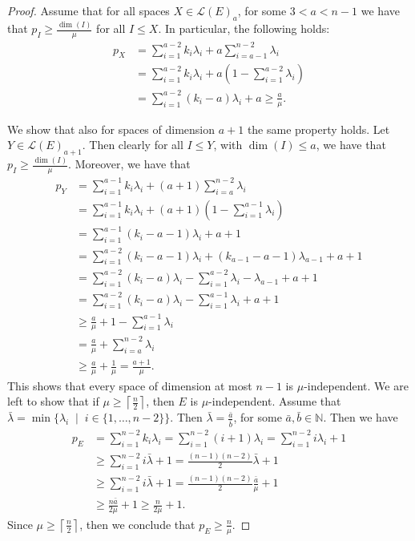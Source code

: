 \documentclass[a4paper,11pt,reqno]{amsart}
\theoremstyle{definition}
\newcommand{\mL}{\mathcal{L}}
\begin{document}
{\begin{proof}
Assume that for all spaces $X\in\mL(E)_a$, for some $3<a<n-1$ we have that $p_I\geq \frac{\dim(I)}{\mu}$ for all $I\leq X$. 
In particular, the following holds:
\begin{align*}
    p_X &= \sum\limits_{i=1}^{a-2}k_i\lambda_i + a\sum\limits_{i=a-1}^{n-2}\lambda_i \\
    &= \sum\limits_{i=1}^{a-2}k_i\lambda_i + a\left(1-\sum\limits_{i=1}^{a-2}\lambda_i \right) \\
    &=\sum\limits_{i=1}^{a-2}(k_i-a)\lambda_i + a \geq \frac{a}{\mu}.
\end{align*}

We show that also for spaces of dimension $a+1$ the same property holds. Let $Y\in\mL(E)_{a+1}$. Then clearly for all $I\leq Y$, with $\dim(I)\leq a$, we have that $p_I\geq \frac{\dim(I)}{\mu}$. Moreover, we have that
\begin{align*}
    p_Y &= \sum\limits_{i=1}^{a-1}k_i\lambda_i + (a+1)\sum\limits_{i=a}^{n-2}\lambda_i \\
    &= \sum\limits_{i=1}^{a-1}k_i\lambda_i + (a+1)\left(1-\sum\limits_{i=1}^{a-1}\lambda_i \right) \\
    &=\sum\limits_{i=1}^{a-1}(k_i-a-1)\lambda_i + a+1\\
     &=\sum\limits_{i=1}^{a-2}(k_i-a-1)\lambda_i + (k_{a-1}-a-1)\lambda_{a-1}+ a+1\\
     &=\sum\limits_{i=1}^{a-2}(k_i-a)\lambda_i -\sum\limits_{i=1}^{a-2}\lambda_i -\lambda_{a-1}+ a+1\\
      &=\sum\limits_{i=1}^{a-2}(k_i-a)\lambda_i -\sum\limits_{i=1}^{a-1}\lambda_i + a+1\\
      &\geq \frac{a}{\mu} +1-\sum\limits_{i=1}^{a-1}\lambda_i\\
      &= \frac{a}{\mu} + \sum\limits_{i=a}^{n-2}\lambda_i\\
      &\geq \frac{a}{\mu} + \frac{1}{\mu} =\frac{a+1}{\mu}.
\end{align*}
This shows that every space of dimension at most $n-1$ is $\mu$-independent. We are left to show that if $\mu\geq \left\lceil \frac{n}{2}\right\rceil$, then $E$ is $\mu$-independent. Assume that $\bar{\lambda}=\min\{\lambda_i \; \mid \; i\in\{1,\dots, n-2\}\}$. Then $\bar{\lambda}=\frac{\bar{a}}{\bar{b}}$, for some $\bar{a},\bar{b}\in\mathbb{N}$. Then we have
\begin{align*}
    p_{E}&= \sum\limits_{i=1}^{n-2}k_i\lambda_i = \sum\limits_{i=1}^{n-2}(i+1)\lambda_i = \sum\limits_{i=1}^{n-2}i\lambda_i +1\\
    &\geq \sum\limits_{i=1}^{n-2}i\bar{\lambda} +1 = \frac{(n-1)(n-2)}{2}\bar{\lambda} +1 \\
     &\geq \sum\limits_{i=1}^{n-2}i\bar{\lambda} +1 = \frac{(n-1)(n-2)}{2}\frac{\bar{a}}{\mu} +1 \\
     &\geq \frac{n\bar{a}}{2\mu}+1 \geq \frac{n}{2\mu}+1.
\end{align*}
Since $\mu\geq\left\lceil\frac{n}{2}\right\rceil$, then we conclude that $p_{E}\geq \frac{n}{\mu}$.


\end{proof}}
\end{document}
